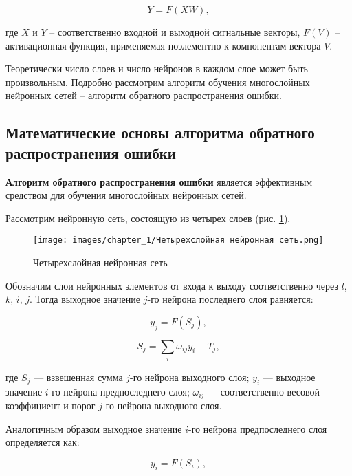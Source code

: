 \begin{equation}
    Y = F(X W),
\end{equation}

где $X$ и $Y$ – соответственно входной и выходной сигнальные векторы, $F(V)$ – активационная функция, применяемая поэлементно к компонентам вектора $V$.

Теоретически число слоев и число нейронов в каждом слое может быть произвольным. Подробно рассмотрим алгоритм обучения многослойных нейронных сетей – алгоритм обратного распространения ошибки.

\subsection{Математические основы алгоритма обратного распространения ошибки}

\textbf{Алгоритм обратного распространения ошибки} является эффективным средством для обучения многослойных нейронных сетей.

Рассмотрим нейронную сеть, состоящую из четырех слоев (рис. \ref{fig:neural_network_4x}).

\begin{figure}[H]
    \centering
    \texttt{[image: images/chapter\_1/Четырехслойная нейронная сеть.png]}
    \caption{Четырехслойная нейронная сеть}
    \label{fig:neural_network_4x}
\end{figure}

Обозначим слои нейронных элементов от входа к выходу соответственно через $l$, $k$, $i$, $j$. Тогда выходное значение $j$-го нейрона последнего слоя равняется:

\begin{equation}
    y_j = F(S_j),
\end{equation}

\begin{equation}
    S_j = \sum_{i}{\omega_{i j} y_i - T_j},
\end{equation}

где $S_j$ — взвешенная сумма $j$-го нейрона выходного слоя; $y_i$ — выходное
значение $i$-го нейрона предпоследнего слоя; $\omega_{i j}$ — соответственно весовой коэффициент и порог $j$-го нейрона выходного слоя.

Аналогичным образом выходное значение $i$-го нейрона предпоследнего слоя определяется как:

\begin{equation}
    y_i = F(S_i),
\end{equation}

